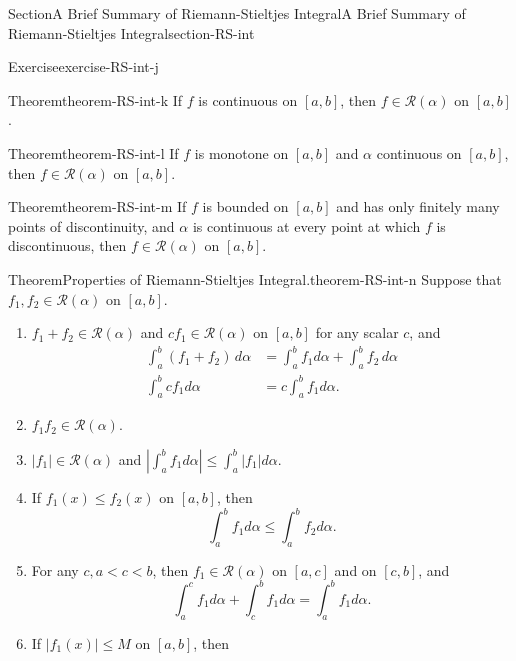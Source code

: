 \documentclass[oneside,10pt,]{article}
\numberwithin{equation}{section}
\newcommand{\cR}{\mathcal{R}}
\newcommand{\amp}{&}
\begin{document}
\begin{sectionptx}{Section}{A Brief Summary of Riemann-Stieltjes Integral}{}{A Brief Summary of Riemann-Stieltjes Integral}{}{}{section-RS-int}
\begin{inlineexercise}{Exercise}{}{exercise-RS-int-j}
\end{inlineexercise}%
\begin{theorem}{Theorem}{}{}{theorem-RS-int-k}%
If \(f\) is continuous on \([a, b]\), then \(f\in \cR (\alpha)\) on \([a, b]\).\end{theorem}
\begin{theorem}{Theorem}{}{}{theorem-RS-int-l}%
If \(f\) is monotone on \([a, b]\) and \(\alpha\) continuous on \([a, b]\), then \(f\in \cR (\alpha)\) on \([a, b]\).\end{theorem}
\begin{theorem}{Theorem}{}{}{theorem-RS-int-m}%
If \(f\) is bounded on \([a, b]\) and has only finitely many points of discontinuity, and \(\alpha\) is continuous at every point at which \(f\) is discontinuous, then \(f\in \cR (\alpha)\) on \([a, b]\).\end{theorem}
\begin{theorem}{Theorem}{Properties of Riemann-Stieltjes Integral.}{}{theorem-RS-int-n}%
Suppose that \(f_{1}, f_{2} \in \cR(\alpha)\) on \([a,  b]\). %
\begin{enumerate}[label=(\alph*)]
\item{}\(f_{1}+f_{2} \in \cR(\alpha)\) and \(c f_{1}  \in \cR(\alpha)\) on \([a,  b]\) for any scalar \(c\), and%
\begin{align*}
\int_{a}^{b} (f_{1}+f_{2})\, d\alpha \amp= \int_{a}^{b} f_{1} d\alpha +\int_{a}^{b} f_{2}\, d\alpha\\
\int_{a}^{b}c f_{1} d\alpha \amp= c  \int_{a}^{b} f_{1} d\alpha.
\end{align*}
%
\item{}\(f_{1} f_{2} \in \cR(\alpha)\).%
\item{}\(|f_{1}| \in \cR(\alpha)\) and \(\left| \int_{a}^{b} f_{1} d\alpha\right|
\le \int_{a}^{b} |f_{1}| d\alpha\).%
\item{}If \(f_{1}(x)\le f_{2}(x)\) on \([a, b]\), then%
\begin{equation*}
\int_{a}^{b} f_{1} d\alpha \le  \int_{a}^{b} f_{2} d\alpha.
\end{equation*}
%
\item{}For any \(c, a < c < b\), then \(f_{1}\in \cR(\alpha)\) on \([a, c]\) and on \([c, b]\), and%
\begin{equation*}
\int_{a}^{c} f_{1} d\alpha +  \int_{c}^{b} f_{1} d\alpha =  \int_{a}^{b} f_{1} d\alpha.
\end{equation*}
%
\item{}If \(|f_{1}(x)|\le M\) on \([a, b]\), then%
\begin{equation*}

\end{equation*}
\end{enumerate}
\end{theorem}
\end{sectionptx}
\end{document}
